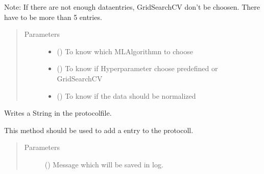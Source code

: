 \documentclass[letterpaper,10pt,english]{sphinxmanual}
\begin{document}
\begin{fulllineitems}
\begin{fulllineitems}
\sphinxAtStartPar
Note:
If there are not enough data\sphinxhyphen{}entries, GridSearchCV don’t be choosen.
There have to be more than 5 entries.
\begin{quote}\begin{description}
\item[{Parameters}] \leavevmode\begin{itemize}
\item {} 
\sphinxAtStartPar
{} (\sphinxstyleliteralemphasis{\sphinxupquote{, }}) \textendash{} To know which ML\sphinxhyphen{}Algorithmn to choose

\item {} 
\sphinxAtStartPar
{} (\sphinxstyleliteralemphasis{\sphinxupquote{, }}) \textendash{} To know if Hyperparameter choose predefined or GridSearchCV

\item {} 
\sphinxAtStartPar
{} (\sphinxstyleliteralemphasis{\sphinxupquote{, }}) \textendash{} To know if the data should be normalized

\end{itemize}

\end{description}\end{quote}

\end{fulllineitems}


\begin{fulllineitems}
\label{\detokenize{anoog.automation:anoog.automation.ai_model.AI_Model.write_log}}
\sphinxAtStartPar
Writes a String in the protocol\sphinxhyphen{}file.

\sphinxAtStartPar
This method should be used to add a entry to the protocoll.
\begin{quote}\begin{description}
\item[{Parameters}] \leavevmode
\sphinxAtStartPar
{} () \textendash{} Message which will be saved in log.

\end{description}\end{quote}

\end{fulllineitems}


\end{fulllineitems}
\end{document}
